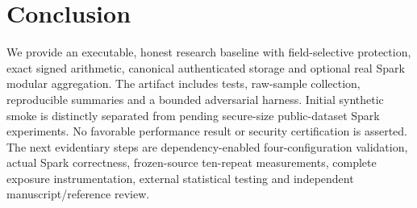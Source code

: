 \documentclass[conference]{IEEEtran}
\begin{document}
\section{Conclusion}
We provide an executable, honest research baseline with field-selective protection, exact signed arithmetic, canonical authenticated storage and optional real Spark modular aggregation. The artifact includes tests, raw-sample collection, reproducible summaries and a bounded adversarial harness. Initial synthetic smoke is distinctly separated from pending secure-size public-dataset Spark experiments. No favorable performance result or security certification is asserted. The next evidentiary steps are dependency-enabled four-configuration validation, actual Spark correctness, frozen-source ten-repeat measurements, complete exposure instrumentation, external statistical testing and independent manuscript/reference review.



\end{document}
